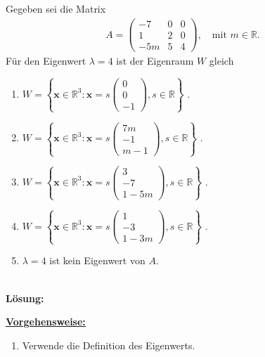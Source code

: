 \subsection*{}
Gegeben sei die Matrix
\begin{align*}
	A =
	\begin{pmatrix}
		-7 & 0 & 0 \\
		1 & 2 & 0 \\
		-5m & 5 & 4
	\end{pmatrix}
	, 
	\quad 
	\textrm{mit } m \in \mathbb{R}.
\end{align*}
Für den Eigenwert $ \lambda = 4 $ ist der Eigenraum $ W $ gleich
\renewcommand{\labelenumi}{(\alph{enumi})}
\begin{enumerate}
	\item 
	$ W
	=
	\left\{
	\textbf{x} \in \mathbb{R}^3
	:
	\textbf{x}
	=
	s 
	\begin{pmatrix}
		0\\ 0 \\ -1
	\end{pmatrix},
	s \in \mathbb{R}
	\right\}
	$
	.
	\item 
	$ W
	=
	\left\{
	\textbf{x} \in \mathbb{R}^3
	:
	\textbf{x}
	=
	s	 
	\begin{pmatrix}
		7m \\ -1 \\ m-1
	\end{pmatrix},
	s \in \mathbb{R}
	\right\}
	$
	.
	\item
	$ W
	=
	\left\{
	\textbf{x} \in \mathbb{R}^3
	:
	\textbf{x}
	=
	s	 
	\begin{pmatrix}
		3 \\ -7 \\ 1 - 5m
	\end{pmatrix},
	s \in \mathbb{R}
	\right\}
	$
	.
	\item
	$ W
	=
	\left\{
	\textbf{x} \in \mathbb{R}^3
	:
	\textbf{x}
	=
	s	 
	\begin{pmatrix}
		1 \\ -3 \\ 1 - 3m
	\end{pmatrix},
	s \in \mathbb{R}
	\right\}
	$
	.
	\item
	$ \lambda = 4 $ ist kein Eigenwert von $ A $.
\end{enumerate}
\ \\
\textbf{Lösung:}
\begin{mdframed}
\underline{\textbf{Vorgehensweise:}}
\renewcommand{\labelenumi}{\theenumi.}
\begin{enumerate}
\item Verwende die Definition des Eigenwerts.
\end{enumerate}
\end{mdframed}

